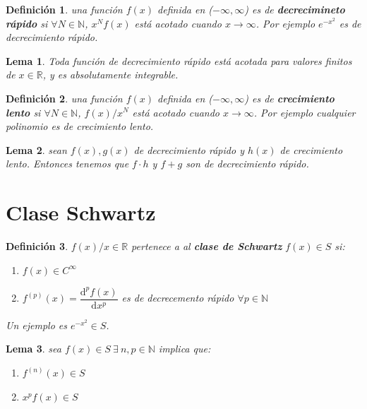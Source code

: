 \documentclass[12pt,a4paper]{book}
\newcommand{\D}{\mathrm{d}}
\newtheorem{lemma}{Lema}[section]
\newtheorem{definicion}{Definición}[section]
\begin{document}
\begin{definicion}
una función $f(x)$ definida en ($-\infty, \infty$) es de \textbf{decrecimineto rápido} si $\forall N \in \mathbb{N}$, $x^N f(x)$ está acotado cuando $x \rightarrow \infty $. Por ejemplo $e^{-x^2}$ es de decrecimiento rápido.
\end{definicion}

\begin{lemma}
Toda función de decrecimiento rápido está acotada para valores finitos de $x \in \mathbb{R}$, y es absolutamente integrable.
\end{lemma}

\begin{definicion}
una función $f(x)$ definida en ($-\infty, \infty$) es de \textbf{crecimiento lento} si $\forall N \in \mathbb{N}$, $f(x)/x^N $ está acotado cuando $x \rightarrow \infty $. Por ejemplo cualquier polinomio es de crecimiento lento.
\end{definicion}

\begin{lemma}
sean $f(x), g(x)$ de decrecimiento rápido y $h(x)$ de crecimiento lento. Entonces tenemos que $f \cdot h$ y $f + g$ son de decrecimiento rápido. 
\end{lemma}



\section{Clase Schwartz}



\begin{definicion}
$f(x) / x  \in \mathbb{R}$ pertenece a al \textbf{clase de Schwartz} $f (x) \in S$ si:
\begin{enumerate}
\item $f(x) \in C^{\infty}$
\item $f^{(p)}(x) = \dfrac{\D^p f(x)}{\D x^p}$ es de decrecemento rápido $\forall p \in \mathbb{N}$
\end{enumerate}
Un ejemplo es $e^{-x^2} \in S$.
\end{definicion}

\begin{lemma}
sea $f(x) \in S \ \exists \ n,p \in  \mathbb{N}$ implica que:
\begin{enumerate}
\item $f^{(n)} (x) \in S$
\item $x^p f(x) \in S$
\end{enumerate} 
\end{lemma}
\end{document}

